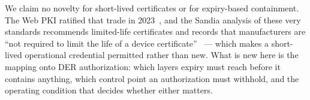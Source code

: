 We claim no novelty for short-lived certificates or for expiry-based containment. The Web PKI
ratified that trade in 2023~\cite{cabf-sc063v4}, and the Sandia analysis of these very standards
recommends limited-life certificates and records that manufacturers are ``not required to limit
the life of a device certificate''~\cite{obert2019recommendations} --- which makes a short-lived
operational credential permitted rather than new. What is new here is the mapping onto DER
authorization: which layers expiry must reach before it contains anything, which control point an
authorization must withhold, and the operating condition that decides whether either matters.
